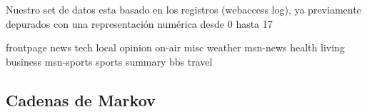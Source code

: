 	Nuestro set de  datos esta basado en los registros (webaccess log), ya previamente depurados con una representación numérica desde 0 hasta 17 

	frontpage news tech local opinion on-air misc weather msn-news health living business msn-sports sports summary bbs travel









\subsection{Cadenas de Markov}







